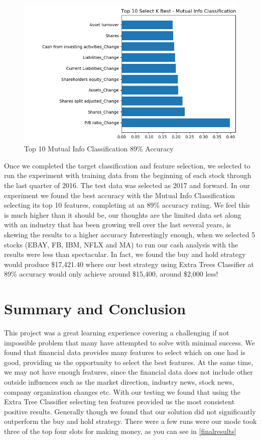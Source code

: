 \documentclass[conference]{IEEEtran}
\begin{document}
\begin{figure}
  \includegraphics[width=\linewidth]{Top10MutualInfoClassification.png}
  \caption{Top 10 Mutual Info Classification 89\% Accuracy}
  \label{mi}
\end{figure}

Once we completed the target classification and feature selection, we selected to run the experiment with training data from the beginning of each stock through the last quarter of 2016. The test data was selected as 2017 and forward. In our experiment we found the best accuracy with the Mutual Info Classification selecting its top 10 features, completing at an 89\% accuracy rating.  We feel this is much higher than it should be, our thoughts are the limited data set along with an industry that has been growing well over the last several years, is skewing the results to a higher accuracy Interestingly enough, when we selected 5 stocks (EBAY, FB, IBM, NFLX and MA)  to run our cash analysis with the results were less than spectacular.  In fact, we found the buy and hold strategy would produce \$17,421.40 where our best strategy using Extra Trees Classifier at 89\% accuracy would only achieve around \$15,400, around \$2,000 less!

\section{Summary and Conclusion}
This project was a great learning experience covering a challenging if not impossible problem that many have attempted to solve with minimal success.  We found that financial data provides many features to select which on one had is good, providing us the opportunity to select the best features.  At the same time, we may not have enough features, since the financial data does not include other outside influences such as the market direction, industry news, stock news, company organization changes etc. With our testing we found that using the Extra Tree Classifier selecting ten features provided us the most consistent positive results.  Generally though we found that our solution did not significantly outperform the buy and hold strategy. There were a few runs were our mode took three of the top four slots for making money, as you can see in \ref{finalresults}
\end{document}
